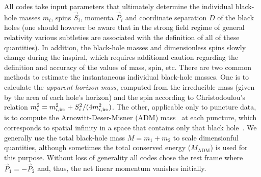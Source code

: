 All codes take input parameters that ultimately determine the
individual black-hole masses $m_i$, spins $\vec{S}_i$, momenta
$\vec{P}_i$ and coordinate separation $D$ of the black holes (one
should however be aware that in the strong field regime of general
relativity various subtleties are associated with the definition of
all of these quantities). In addition, the black-hole masses and
dimensionless spins slowly change during the inspiral, which requires
additional caution regarding the definition and accuracy of the values
of mass, spin, etc.  There are two common methods to estimate the
instantaneous individual black-hole masses. One is to calculate the
\emph{apparent-horizon mass}, computed from the irreducible mass
(given by the area of each hole's horizon) and the spin according to
Christodoulou's \cite{Christodoulou:1970wf} relation $m_i^2 =
m_{i{\rm,irr}}^2 + S_i^2/(4 m_{i,{\rm irr}}^2)$. The other, applicable
only to puncture data, is to compute the Arnowitt-Deser-Misner (ADM)
mass~\cite{Arnowitt1962} at each puncture, which corresponds to
spatial infinity in a space that contains only that black
hole~\cite{Brandt:1997tf}. We generally use the total black-hole mass
$M=m_1+m_2$ to scale dimensionful quantities, although sometimes the
total conserved energy ($M_\mathrm{ADM}$) is used for this purpose. 
%
%
Without loss of generality all codes chose the rest frame where $\vec
P_1 = -\vec P_2$ and, thus, the net linear momentum vanishes
initially.     
%


